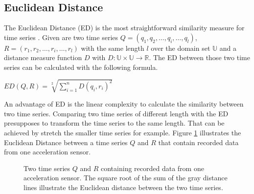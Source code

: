 \subsection{Euclidean Distance}
The Euclidean Distance (ED) is the most straightforward similarity measure for time series \cite{ding2008querying}.
Given are two time series $Q = (q_1, q_2, \dots, q_i, \dots, q_l)$, $R = (r_1, r_2, \dots, r_i, \dots, r_l)$ with the
same length $l$ over the domain set $\mathbb{U}$ and a distance measure function $D$ with
$D: \mathbb{U} \times \mathbb{U} \to \mathbb{R}$. The ED between those two time series can be calculated with the
following formula.
\begin{center}
    $ED(Q, R) = \sqrt[2]{\sum \limits_{i=1}^{n} D(q_i, r_i)^2}$
\end{center}
An advantage of ED is the linear complexity to calculate the similarity between two time series. Comparing two time
series of different length with the ED presupposes to transform the time series to the same length. That can be achieved
by stretch the smaller time series for example. Figure \ref{fig:euclideandistance} illustrates the Euclidean Distance
between a time series $Q$ and $R$ that contain recorded data from one acceleration sensor.

\begin{figure}[H]
    \begin{center}
    \end{center}
    \caption{Two time series $Q$ and $R$ containing recorded data from one acceleration sensor. The square root of the
    sum of the gray distance lines illustrate the Euclidean distance between the two time series.}
    \label{fig:euclideandistance}
\end{figure}
